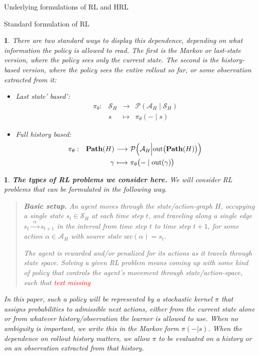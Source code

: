 \documentclass[11pt]{article}
\newtheorem{ermark}[subsubsection]{}
\begin{document}
\begin{section}{Underlying formulations of RL and HRL}
\begin{subsection}{Standard formulation of RL}
\begin{ermark}
There are two standard ways to display this dependence, depending on what information the policy is allowed to read. The first is the Markov or last-state version, where the policy sees only the current state. The second is the history-based version, where the policy sees the entire rollout so far, or some observation extracted from it:
\begin{itemize}
\item
Last state' based':
$$
\begin{array}{rrcl}
\pi_{\theta}:
&\mathcal{S}_{H}
&
\!\!\!\!\longrightarrow\!\!\!\!
&\mathcal{P}(\mathcal{A}_{H}\mid\mathcal{S}_{H}) \\[5pt]
&
s
&
\!\!\!\!\longmapsto\!\!\!\!
& \pi_{\theta}(-\mid s)
\end{array}
$$
\item
Full history based:
$$
\begin{array}{rrcl}
\pi_{\theta}:
&\bold{Path}(H)
&
\!\!\!\!\longrightarrow\!\!\!\!
&\mathcal{P}\Big(\mathcal{A}_{H}\Big|\text{out}\big(\bold{Path}(H)\big)\Big) \\[7pt]
&
\gamma
&
\!\!\!\!\longmapsto\!\!\!\!
& \pi_{\theta}\big(-\mid \text{out}(\gamma)\big)
\end{array}
$$
\end{itemize}
\end{ermark}

\begin{ermark}
\label{remark:my-naive-question}
{\bf The types of RL problems we consider here.}
\normalfont
We will consider RL problems that can be formulated in the following way.

\begin{quote}
{\bf Basic setup.}
An agent moves through the state/action-graph $H$, occupying a single state $s_{t}\in\mathcal{S}_{H}$ at each time step $t$, and traveling along a single edge 
$
s_{t}\xrightarrow{\ \ \alpha\ \ }s_{t+1}
$
in the interval from time step $t$ to time step $t+1$, for some action $\alpha\in\mathcal{A}_{H}$ with source state $\text{src}(\alpha)=s_{t}$.

The agent is rewarded and/or penalized for its actions as it travels through state space. {\em Solving} a given RL problem means coming up with some kind of policy that controls the agent's movement through state/action-space, such that \textcolor{red}{text missing}
\end{quote}
In this paper, such a policy will be represented by a stochastic kernel $\pi$ that assigns probabilities to admissible next actions, either from the current state alone or from whatever history/observation the learner is allowed to use. When no ambiguity is important, we write this in the Markov form $\pi(-|s)$. When the dependence on rollout history matters, we allow $\pi$ to be evaluated on a history or on an observation extracted from that history.
\end{ermark}
 

\end{subsection}
\end{section}
\end{document}
